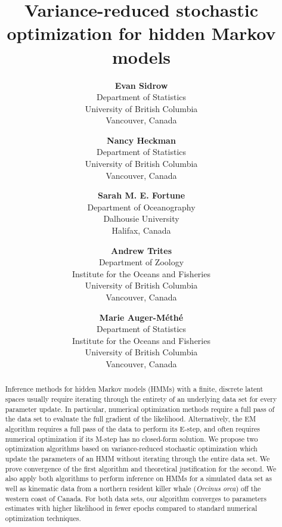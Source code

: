 \documentclass{article}
\title{Variance-reduced stochastic optimization for hidden Markov models}
\author{
  \textbf{Evan Sidrow} \\
  Department of Statistics\\
  University of British Columbia\\
  Vancouver, Canada \\
  \and
  \textbf{Nancy Heckman} \\
  Department of Statistics \\
  University of British Columbia \\
  Vancouver, Canada \\
  \and
  \textbf{Sarah M. E. Fortune} \\
  Department of Oceanography \\
  Dalhousie University \\
  Halifax, Canada \\
  \and
  \textbf{Andrew Trites} \\
  Department of Zoology \\
  Institute for the Oceans and Fisheries \\
  University of British Columbia \\
  Vancouver, Canada \\
  \and
  \textbf{Marie Auger-M\'eth\'e} \\
  Department of Statistics \\
  Institute for the Oceans and Fisheries \\
  University of British Columbia \\
  Vancouver, Canada \\
}
\begin{document}
\maketitle

\begin{abstract}

    Inference methods for hidden Markov models (HMMs) with a finite, discrete latent spaces usually require iterating through the entirety of an underlying data set for every parameter update. In particular, numerical optimization methods require a full pass of the data set to evaluate the full gradient of the likelihood. Alternatively, the EM algorithm requires a full pass of the data to perform its E-step, and often requires numerical optimization if its M-step has no closed-form solution. We propose two optimization algorithms based on variance-reduced stochastic optimization which update the parameters of an HMM without iterating through the entire data set. We prove convergence of the first algorithm and theoretical justification for the second. We also apply both algorithms to perform inference on HMMs for a simulated data set as well as kinematic data from a northern resident killer whale ({\em{Orcinus orca}}) off the western coast of Canada. For both data sets, our algorithm converges to parameters estimates with higher likelihood in fewer epochs compared to standard numerical optimization techniques.



\end{abstract}
\end{document}
